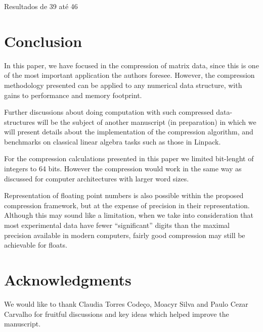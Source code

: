 \documentclass[10pt]{article}
\begin{document}
Resultados de 39 até 46

\section*{Conclusion}

In this paper, we have focused in the compression of matrix data, since this is
one of the most important application the authors foresee. However, the
compression methodology presented can be applied to any numerical data
structure, with gains to performance and memory footprint\cite{teseCrysttian}. 

Further discussions about doing computation with such compressed data-structures
will be the subject of another manuscript (in preparation) in which we will
present details about the implementation of the compression algorithm, and
benchmarks on classical linear algebra tasks such as those in
Linpack\cite{dongarra1979linpack}.

For the compression calculations presented in this paper we limited bit-lenght of integers to 64 bits. However the 
compression would work in the same way as discussed for computer architectures with larger word sizes. 

Representation of floating point numbers is also possible within the proposed compression framework, but at the expense 
of precision in their representation. Although this may sound like a limitation, when we take into consideration that 
most experimental data have fewer ``significant'' digits than the maximal precision available in modern computers, 
fairly good compression may still be achievable for floats. 



\section*{Acknowledgments}
We would like to thank Claudia Torres Code\c{c}o, Moacyr Silva and Paulo
Cezar Carvalho for fruitful discussions and key ideas which helped improve the
manuscript.


\end{document}
